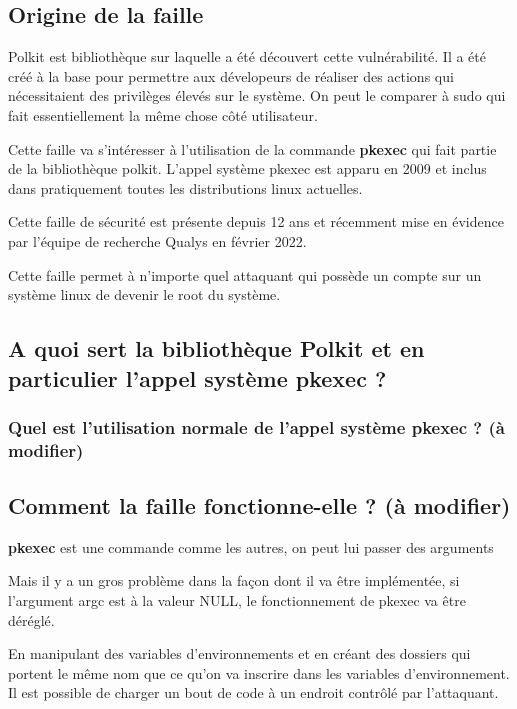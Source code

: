\documentclass[a4paper, 12pt]{article}
\begin{document}
		\subsection{Origine de la faille}   
   		\begin{flushleft}
			\noindent 	Polkit est bibliothèque sur laquelle a été découvert cette vulnérabilité. Il a été créé à la base pour permettre aux dévelopeurs de réaliser des actions qui nécessitaient des privilèges élevés sur le système. On peut le comparer à sudo qui fait essentiellement la même chose côté utilisateur.
   			\item Cette faille va s'intéresser à l'utilisation de la commande \textbf{pkexec} qui fait partie de la bibliothèque polkit. L'appel système pkexec est apparu en 2009 et inclus dans pratiquement toutes les distributions linux actuelles.
   			\item Cette faille de sécurité est présente depuis 12 ans et récemment mise en évidence par l'équipe de recherche Qualys en février 2022. \cite{qualys}
   			\item Cette faille permet à n’importe quel attaquant qui possède un compte sur un système linux de devenir le root du système.
            \subsection{A quoi sert la bibliothèque Polkit et en particulier l'appel système pkexec ? }
            \subsubsection{Quel est l'utilisation normale de l'appel système pkexec ? (à modifier)}
   		\end{flushleft}
   		\subsection{Comment la faille fonctionne-elle ? (à modifier) }
   		\begin{flushleft}
   			\noindent \textbf{pkexec} est une commande comme les autres, on peut lui passer des arguments
   			\item Mais il y a un gros problème dans la façon dont il va être implémentée, si l'argument argc est à la valeur NULL, le fonctionnement de pkexec va être déréglé. 
   			\item En manipulant des variables d'environnements et en créant des dossiers qui portent le même nom que ce qu'on va inscrire dans les variables d'environnement. Il est possible de charger un bout de code à un endroit contrôlé par l'attaquant. 
   		\end{flushleft}
   		
\end{document}
